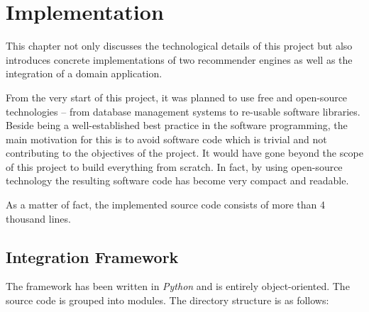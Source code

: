 \chapter{Implementation}

This chapter not only discusses the technological details of this project but also introduces concrete implementations of two recommender engines as well as the integration of a domain application.

From the very start of this project, it was planned to use free and open-source technologies -- from database management systems to re-usable software libraries. Beside being a well-established best practice in the software programming, the main motivation for this is to avoid software code which is trivial and not contributing to the objectives of the project. It would have gone beyond the scope of this project to build everything from scratch. In fact, by using open-source technology the resulting software code has become very compact and readable.

As a matter of fact, the implemented source code consists of more than 4 thousand lines.

\section{Integration Framework}

The framework has been written in \emph{Python} and is entirely object-oriented. The source code is grouped into modules. The directory structure is as follows:

